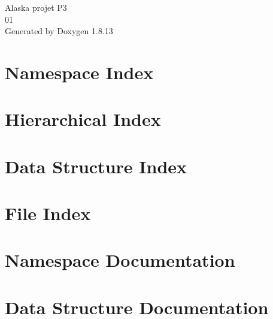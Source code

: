\documentclass[twoside]{book}
\newcommand{\+}{\discretionary{\mbox{\scriptsize$\hookleftarrow$}}{}{}}
\newcommand{\clearemptydoublepage}{%
  \newpage{\pagestyle{empty}\cleardoublepage}%
}
\begin{document}
\hypersetup{pageanchor=false,
             bookmarksnumbered=true,
             pdfencoding=unicode
            }
\begin{titlepage}
\vspace*{7cm}
\begin{center}%
{\Large Alaska projet P3 \\[1ex]\large 01 }\\
\vspace*{1cm}
{\large Generated by Doxygen 1.8.13}\\
\end{center}
\end{titlepage}
\clearemptydoublepage
{}
\tableofcontents
\clearemptydoublepage
{}
\hypersetup{pageanchor=true}

\chapter{Namespace Index}

\chapter{Hierarchical Index}

\chapter{Data Structure Index}

\chapter{File Index}

\chapter{Namespace Documentation}






\chapter{Data Structure Documentation}
















\end{document}
